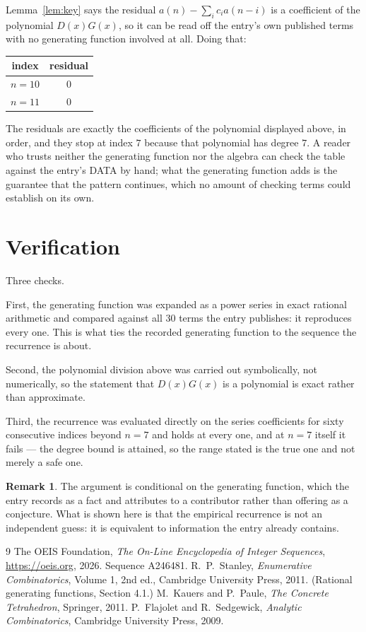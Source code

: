 \documentclass[11pt,a4paper]{article}
\theoremstyle{plain}
\theoremstyle{definition}
\newtheorem{remark}[theorem]{Remark}
\begin{document}
Lemma~\ref{lem:key} says the residual $a(n)-\sum_ic_ia(n-i)$ is a coefficient of the
polynomial $D(x)G(x)$, so it can be read off the entry's own published terms with no
generating function involved at all. Doing that:
\begin{center}
\begin{tabular}{cc}
index & residual \\ \hline
$n=10$ & $0$ \\
$n=11$ & $0$
\end{tabular}
\end{center}
The residuals are exactly the coefficients of the polynomial displayed above, in order, and
they stop at index $7$ because that polynomial has degree $7$. A reader who trusts
neither the generating function nor the algebra can check the table against the entry's DATA
by hand; what the generating function adds is the guarantee that the pattern continues, which
no amount of checking terms could establish on its own.

\section{Verification}

Three checks.

First, the generating function was expanded as a power series in exact rational arithmetic and
compared against all $30$ terms the entry publishes: it reproduces every one. This is
what ties the recorded generating function to the sequence the recurrence is about.

Second, the polynomial division above was carried out symbolically, not numerically, so the
statement that $D(x)G(x)$ is a polynomial is exact rather than approximate.

Third, the recurrence was evaluated directly on the series coefficients for sixty consecutive
indices beyond $n=7$ and holds at every one, and at $n=7$ itself it fails --- the
degree bound is attained, so the range stated is the true one and not merely a safe one.

\begin{remark}
The argument is conditional on the generating function, which the entry records as a fact and
attributes to a contributor rather than offering as a conjecture. What is shown here is that
the empirical recurrence is not an independent guess: it is equivalent to information the
entry already contains.
\end{remark}

\begin{thebibliography}{9}
 The OEIS Foundation, \emph{The On-Line Encyclopedia of Integer
Sequences}, \url{https://oeis.org}, 2026. Sequence A246481.
 R.~P.~Stanley, \emph{Enumerative Combinatorics}, Volume 1, 2nd ed.,
Cambridge University Press, 2011. (Rational generating functions, Section 4.1.)
 M.~Kauers and P.~Paule, \emph{The Concrete Tetrahedron}, Springer, 2011.
 P.~Flajolet and R.~Sedgewick, \emph{Analytic Combinatorics}, Cambridge
University Press, 2009.
\end{thebibliography}
\end{document}
